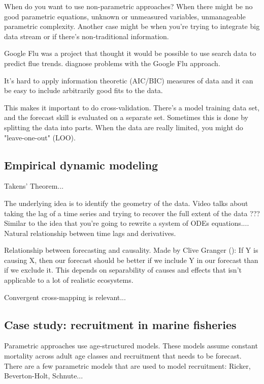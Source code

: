 \documentclass[12pt, oneside]{article}   	%
\begin{document}
When do you want to use non-parametric approaches? When there might be no good parametric equations, unknown or unmeasured variables, unmanageable parametric complexity. Another case might be when you're trying to integrate big data stream or if there's non-traditional information.

Google Flu was a project that thought it would be possible to use search data to predict flue trends. \cite{lazer2014} diagnose problems with the Google Flu approach.

It's hard to apply information theoretic (AIC/BIC) measures of data and it can be easy to include arbitrarily good fits to the data. 

This makes it important to do cross-validation. There's a model training data set, and the forecast skill is evaluated on a separate set. Sometimes this is done by splitting the data into parts. When the data are really limited, you might do "leave-one-out" (LOO).

\subsection{Empirical dynamic modeling}

Takens' Theorem...

The underlying idea is to identify the geometry of the data. Video talks about taking the lag of a time series and trying to recover the full extent of the data ??? Similar to the idea that you're going to rewrite a system of ODEs equations.... Natural relationship between time lags and derivatives.

Relationship between forecasting and causality. Made by Clive Granger (\cite{granger1969}): If Y is causing X, then our forecast should be better if we include Y in our forecast than if we exclude it. This depends on separability of causes and effects that isn't applicable to a lot of realistic ecosystems. 

Convergent cross-mapping is relevant...

\subsection{Case study: recruitment in marine fisheries}

Parametric approaches use age-structured models. These models assume constant mortality across adult age classes and recruitment that needs to be forecast. There are a few parametric models that are used to model recruitment: Ricker, Beverton-Holt, Schnute...
\end{document}
